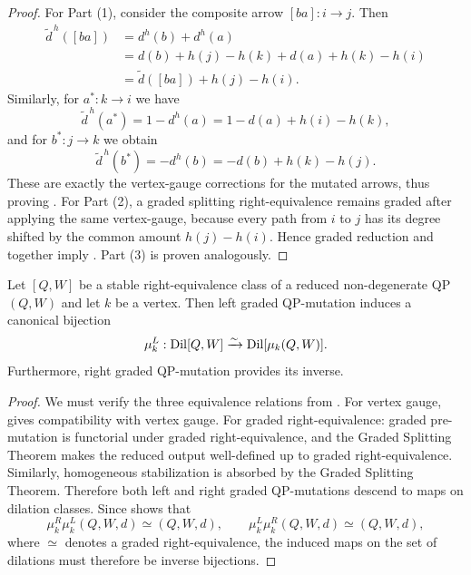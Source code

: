 \begin{proof}
For Part (1), consider the composite arrow \([ba]:i\to j\). Then
\begin{align*}
 \widetilde d^{\,h}([ba])
 &=d^h(b)+d^h(a)\\
 &=d(b)+h(j)-h(k)+d(a)+h(k)-h(i)\\
 &=\widetilde d([ba])+h(j)-h(i).
\end{align*}
Similarly, for \(a^*:k\to i\) we have
\[
 \widetilde d^{\,h}(a^*)
 =1-d^h(a)
 =1-d(a)+h(i)-h(k),
\]
and for \(b^*:j\to k\) we obtain
\[
 \widetilde d^{\,h}(b^*)
 =-d^h(b)
 =-d(b)+h(k)-h(j).
\]
These are exactly the vertex-gauge corrections for the mutated arrows, thus proving
. For Part (2), a graded splitting right-equivalence remains
graded after applying the same vertex-gauge, because every path from \(i\) to \(j\)
has its degree shifted by the common amount \(h(j)-h(i)\). Hence graded
reduction and  together imply . Part (3) is proven analogously.
\end{proof}

\begin{theorem}\label{thm:G1-mutation}
Let $[Q,W]$ be a stable right-equivalence class of a reduced
non-degenerate QP $(Q,W)$ and let \(k\) be a vertex. Then left graded QP-mutation induces a
canonical bijection
\[
 \mu_k^L:\operatorname{Dil}[Q,W]
 \xrightarrow{\sim}
 \operatorname{Dil}[\mu_k(Q,W)].
\]
Furthermore, right graded QP-mutation provides its inverse.
\end{theorem}

\begin{proof}
We must verify the three equivalence relations from . For vertex gauge,  gives compatibility with vertex gauge. For graded right-equivalence: graded pre-mutation is functorial under graded
right-equivalence, and the Graded Splitting Theorem \cite[Theorem 6.6]{AO} makes the reduced output
well-defined up to graded right-equivalence. Similarly, homogeneous stabilization is absorbed by the Graded Splitting Theorem. Therefore both left and
right graded QP-mutations descend to maps on dilation classes. Since \cite[Lemma 6.9]{AO} shows that
\[
 \mu_k^R\mu_k^L(Q,W,d)
 \simeq(Q,W,d),
 \qquad
 \mu_k^L\mu_k^R(Q,W,d)
 \simeq(Q,W,d),
\]
where $\simeq$ denotes a graded right-equivalence, the induced maps on the set of dilations must therefore be inverse bijections.
\end{proof}